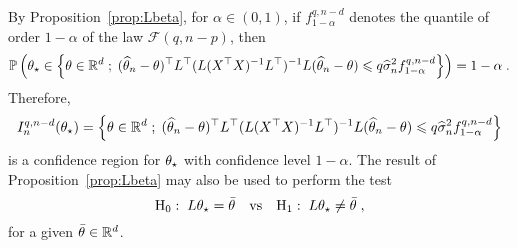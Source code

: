 By Proposition~\ref{prop:Lbeta}, for $\alpha\in(0,1)$, if $f_{1-\alpha}^{q,n-d}$ denotes the quantile of order $1-\alpha$ of the law $\mathcal{F}(q,n-p)$, then 
\[
\mathbb{P}\left(\theta_{\star}\in \left\{\theta\in\mathbb{R}^d\;;\; (\widehat {\theta}_{n} -\theta)^\top L^\top(L(X^\top X)^{-1}L^\top)^{-1}L(\widehat {\theta}_{n} -\theta)\leqslant q\widehat\sigma^2_{n}f_{1-\alpha}^{q,n-d}\right\}\right) = 1-\alpha\;.
\]
Therefore, 
\[
I^{q,n-d}_{n}(\theta_{\star}) = \left\{\theta\in\mathbb{R}^d\;;\; (\widehat {\theta}_{n} -\theta)^\top L^\top(L(X^\top X)^{-1}L^\top)^{-1}L(\widehat {\theta}_{n} -\theta)\leqslant q\widehat\sigma^2_{n}f_{1-\alpha}^{q,n-d}\right\}
\]
 is a confidence region for $\theta_{\star}$ with confidence level $1-\alpha$. The result of Proposition~\ref{prop:Lbeta} may also be used to perform the test 
\[
\mathrm{H}_0:\; L\theta_{\star} = \bar{\theta} \quad\mathrm{vs} \quad \mathrm{H}_1:\; L\theta_{\star} \neq \bar {\theta}\;,
\]
for a given $\bar {\theta} \in\mathbb{R}^d$.




